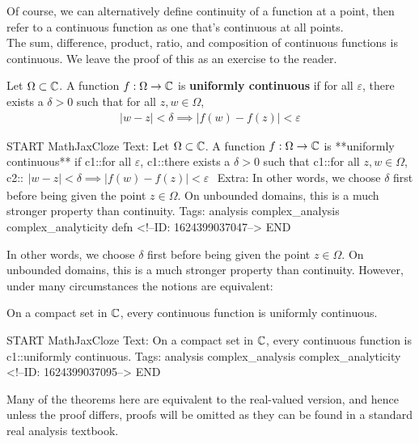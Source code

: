 \documentclass{memoir}
\begin{document}
Of course, we can alternatively define continuity of a function at a point, then refer to a continuous function as one that's continuous at all points.\\

The sum, difference, product, ratio, and composition of continuous functions is continuous. We leave the proof of this as an exercise to the reader.
\begin{defn}
	Let \(\Omega \subset \mathbb{C}\). A function \(f:\Omega\to \mathbb{C}\) is \textbf{uniformly continuous} if for all \(\varepsilon\), there exists a \(\delta>0\) such that for all \(z,w \in \Omega\),
	\begin{align*}
		|w-z| < \delta \implies \left| f(w)-f(z) \right| < \varepsilon
	\end{align*}
\end{defn}

\begin{anki}
START
MathJaxCloze
Text: Let \(\Omega \subset \mathbb{C}\). A function \(f:\Omega\to \mathbb{C}\) is **uniformly continuous** if {{c1::for all \(\varepsilon\)}}, {{c1::there exists a \(\delta>0\)}} such that {{c1::for all \(z,w \in \Omega\)}},
{{c2::\(\begin{align*}
        	|w-z| < \delta \implies \left| f(w)-f(z) \right| < \varepsilon
        \end{align*}\)}}
Extra: In other words, we choose \(\delta \) first before being given the point \(z \in \Omega\). On unbounded domains, this is a much stronger property than continuity. 
Tags: analysis complex_analysis complex_analyticity defn
<!--ID: 1624399037047-->
END
\end{anki}

In other words, we choose \(\delta \) first before being given the point \(z \in \Omega\). On unbounded domains, this is a much stronger property than continuity. However, under many circumstances the notions are equivalent:
\begin{thm}
	On a compact set in \(\mathbb{C}\), every continuous function is uniformly continuous.
\end{thm}
\begin{anki}
START
MathJaxCloze
Text: On a compact set in \(\mathbb{C}\), every continuous function is {{c1::uniformly continuous}}.
Tags: analysis complex_analysis complex_analyticity
<!--ID: 1624399037095-->
END
\end{anki}

Many of the theorems here are equivalent to the real-valued version, and hence unless the proof differs, proofs will be omitted as they can be found in a standard real analysis textbook.\\
\end{document}

